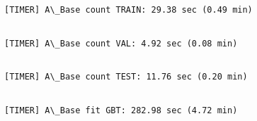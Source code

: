 \documentclass[11pt]{article}
\begin{document}
    \begin{Verbatim}[commandchars=\\\{\}]

    \end{Verbatim}

    \begin{Verbatim}[commandchars=\\\{\}]
[TIMER] A\_Base count TRAIN: 29.38 sec (0.49 min)
    \end{Verbatim}

    \begin{Verbatim}[commandchars=\\\{\}]

    \end{Verbatim}

    \begin{Verbatim}[commandchars=\\\{\}]
[TIMER] A\_Base count VAL: 4.92 sec (0.08 min)
    \end{Verbatim}

    \begin{Verbatim}[commandchars=\\\{\}]

    \end{Verbatim}

    \begin{Verbatim}[commandchars=\\\{\}]
[TIMER] A\_Base count TEST: 11.76 sec (0.20 min)
    \end{Verbatim}

    \begin{Verbatim}[commandchars=\\\{\}]

    \end{Verbatim}

    \begin{Verbatim}[commandchars=\\\{\}]
[TIMER] A\_Base fit GBT: 282.98 sec (4.72 min)
    \end{Verbatim}
\end{document}
